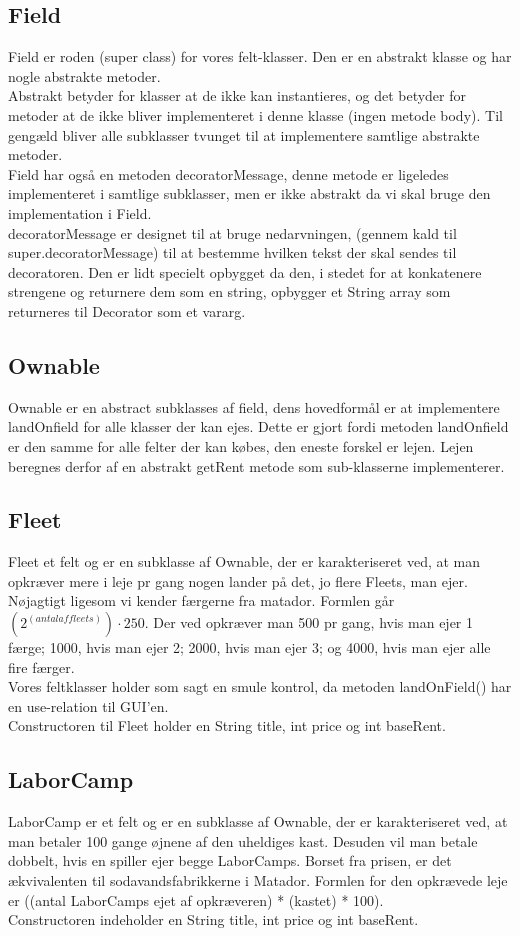 \subsection*{Field}
Field er roden (super class) for vores felt-klasser. Den er en abstrakt klasse
og har nogle abstrakte metoder.\\
\indent Abstrakt betyder for klasser at de ikke kan instantieres, og det betyder
for metoder at de ikke bliver implementeret i denne klasse (ingen metode body).
Til gengæld bliver alle subklasser tvunget til at implementere samtlige
abstrakte metoder.\\
\indent Field har også en metoden decoratorMessage, denne metode er ligeledes
implementeret i samtlige subklasser, men er ikke abstrakt da vi skal bruge den
implementation i Field.\\
\indent decoratorMessage er designet til at bruge nedarvningen, (gennem kald til
super.decoratorMessage) til at bestemme hvilken tekst der skal sendes til
decoratoren. Den er lidt specielt opbygget da den, i stedet for at konkatenere
strengene og returnere dem som en string, opbygger et String array som
returneres til Decorator som et vararg.
\subsection*{Ownable}
Ownable er en abstract subklasses af field, dens hovedformål er at implementere
landOnfield for alle klasser der kan ejes. Dette er gjort fordi metoden
landOnfield er den samme for alle felter der kan købes, den eneste forskel er
lejen. Lejen beregnes derfor af en abstrakt getRent metode som sub-klasserne
implementerer.
\subsection*{Fleet}
Fleet et felt og er en subklasse af Ownable, der er karakteriseret ved, at man
opkræver mere i leje pr gang nogen lander på det, jo flere Fleets, man ejer.
Nøjagtigt ligesom vi kender færgerne fra matador. Formlen går $(2^(antal af
fleets)) \cdot 250$. Der ved opkræver man 500 pr gang, hvis man ejer 1 færge;
1000, hvis man ejer 2; 2000, hvis man ejer 3; og 4000, hvis man ejer alle fire
færger.\\
\indent Vores feltklasser holder som sagt en smule kontrol, da metoden
landOnField() har en use-relation til GUI’en.\\
\indent Constructoren til Fleet holder en String title, int price og int
baseRent.
\subsection*{LaborCamp}
LaborCamp er et felt og er en subklasse af Ownable, der er karakteriseret ved,
at man betaler 100 gange øjnene af den uheldiges kast. Desuden vil man betale
dobbelt, hvis en spiller ejer begge LaborCamps. Borset fra prisen, er det
ækvivalenten til sodavandsfabrikkerne i Matador. Formlen for den opkrævede leje
er ((antal LaborCamps ejet af opkræveren) * (kastet) * 100).\\
\indent Constructoren indeholder en String title, int price og int baseRent.
